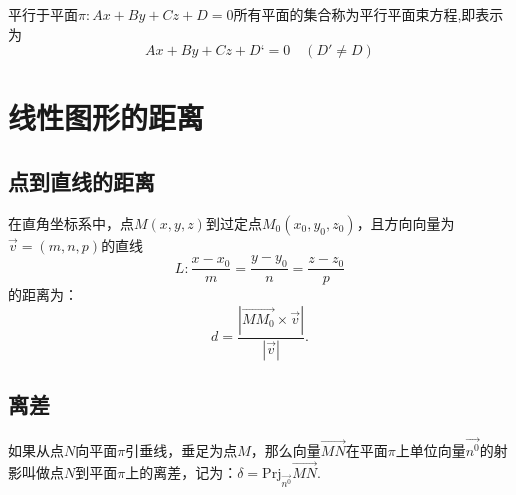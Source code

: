 平行于平面$\pi :Ax+By+Cz+D=0$所有平面的集合称为{\color{dy}平行平面束方程},即表示为
\begin{equation}
Ax+By+Cz+D‘=0\quad (D' \neq D)
\end{equation}



\section{线性图形的距离}
\subsection{点到直线的距离}
\ttheorem[点到直线的距离]
在{\color{dy}直角坐标系}中，点$M(x,y,z)$到过定点$M_0(x_0,y_0,z_0)$，且方向向量为$\overrightarrow{v}=(m,n,p)$的直线
\begin{equation*}
L: \frac{x-x_0}{m}=\frac{y-y_0}{n}=\frac{z-z_0}{p}
\end{equation*}
的距离为：
\begin{equation}
d=\frac{|\overrightarrow{MM_0} \times \overrightarrow{v}|}{\left| \overrightarrow{v}\right| }.
\end{equation}


\subsection{离差}
\tdefination[离差]
\quad 如果从点$N$向平面$\pi $引垂线，垂足为点$M$，那么向量$\overrightarrow{MN}$在平面$\pi $上单位向量$\overrightarrow{n^0}$的射影叫做点$N$到平面$\pi $上的{\color{dy}离差}，记为：$\delta =\mathrm{Prj}_{\overrightarrow{n^0}}\overrightarrow{MN}.$

